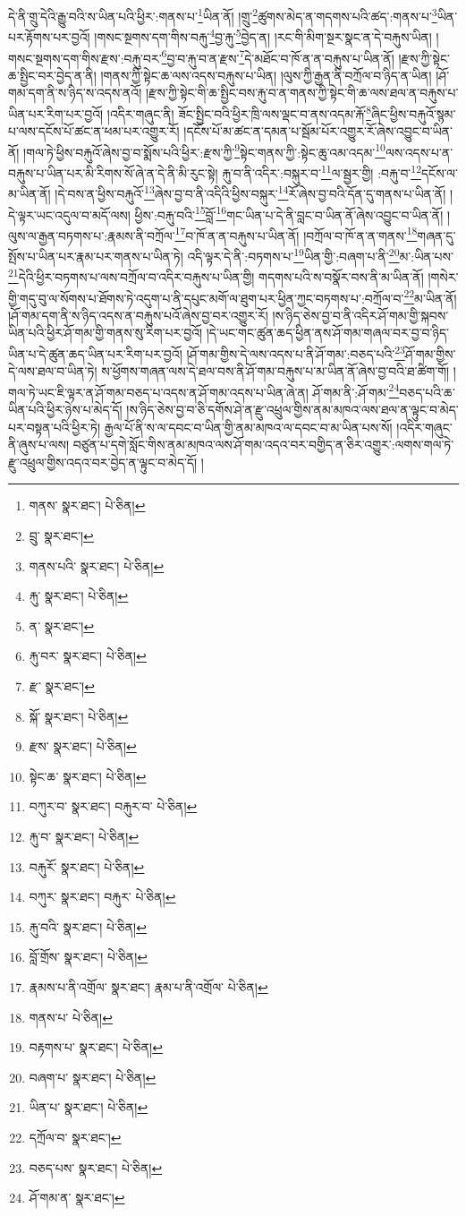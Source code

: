 དེ་ནི་གྲུ་དེའི་རྒྱུ་བའི་ས་ཡིན་པའི་ཕྱིར་:གནས་པ་\footnote{གནས་  སྣར་ཐང་།  པེ་ཅིན། }ཡིན་ནོ། །གྲུ་\footnote{བྲུ་  སྣར་ཐང་། }ཚུགས་མེད་ན་གདགས་པའི་ཚད་:གནས་པ་\footnote{གནས་པའི་  སྣར་ཐང་།  པེ་ཅིན། }ཡིན་པར་རྟོགས་པར་བྱའོ། །གསང་སྔགས་དག་གིས་བརྐུ་\footnote{རྐུ་  སྣར་ཐང་།  པེ་ཅིན། }བྱ་རྐུ་\footnote{ན་  སྣར་ཐང་། }བྱེད་ན། །རང་གི་མིག་སྔར་སྣང་ན་དེ་བརྐུས་ཡིན། །གསང་སྔགས་དག་གིས་རྫས་:བརྐུ་བར་\footnote{རྐུ་བར་  སྣར་ཐང་།  པེ་ཅིན། }བྱ་བ་རྐུ་བ་ན་རྫས་\footnote{རྫ་  སྣར་ཐང་། }དེ་མཐོང་བ་ཁོ་ན་ན་བརྐུས་པ་ཡིན་ནོ། །རྫས་ཀྱི་སྟེང་ཆ་སྤྱིང་བར་བྱེད་ན་ནི། །གནས་ཀྱི་སྟེང་ཆ་ལས་འདས་བརྐུས་པ་ཡིན། །ལུས་ཀྱི་རྒྱན་ནི་བཀྲོལ་བ་ཉིད་ན་ཡིན། །ཤོ་གམ་དག་ནི་ས་ཉིད་ས་འདས་ནའོ། །རྫས་ཀྱི་སྟེང་གི་ཆ་སྤྱིང་བས་རྐུ་བ་ན་གནས་ཀྱི་སྟེང་གི་ཆ་ལས་ཐལ་ན་བརྐུས་པ་ཡིན་པར་རིག་པར་བྱའོ། །འདིར་གཞུང་ནི། ཟོང་སྤྱིང་བའི་ཕྱིར་ཁྲི་ལས་ལྡང་བ་ནས་འདམ་རྐོ་\footnote{སྐོ་  སྣར་ཐང་།  པེ་ཅིན། }ཞིང་ཕྱིས་བརྐུའོ་སྙམ་པ་ལས་དངོས་པོ་ཚང་ན་ཕམ་པར་འགྱུར་རོ། །དངོས་པོ་མ་ཚང་ན་དམན་པ་སྦོམ་པོར་འགྱུར་རོ་ཞེས་འབྱུང་བ་ཡིན་ནོ། །གལ་ཏེ་ཕྱིས་བརྐུའོ་ཞེས་བྱ་བ་སྨོས་པའི་ཕྱིར་:རྫས་ཀྱི་\footnote{རྫས་  སྣར་ཐང་།  པེ་ཅིན། }སྟེང་གནས་ཀྱི་:སྟེང་ཆུ་འམ་འདམ་\footnote{སྟེང་ཆ་  སྣར་ཐང་།  པེ་ཅིན། }ལས་འདས་པ་ན་བརྐུས་པ་ཡིན་པར་མི་རིགས་སོ་ཞེ་ན་དེ་ནི་མི་རུང་སྟེ། རྐུ་བ་ནི་འདིར་:བསྐུར་བ་\footnote{བཀུར་བ་  སྣར་ཐང་། བརྐུར་བ་  པེ་ཅིན། }ལ་སྦྱར་གྱི། :བརྐུ་བ་\footnote{རྐུ་བ་  སྣར་ཐང་།  པེ་ཅིན། }དངོས་ལ་མ་ཡིན་ནོ། །དེ་བས་ན་ཕྱིས་བརྐུའོ་\footnote{བརྐུརོ་  སྣར་ཐང་།  པེ་ཅིན། }ཞེས་བྱ་བ་ནི་འདིའི་ཕྱིས་བསྐུར་\footnote{བཀུར་  སྣར་ཐང་། བརྐུར་  པེ་ཅིན། }རོ་ཞེས་བྱ་བའི་དོན་དུ་གནས་པ་ཡིན་ནོ། །དེ་ལྟར་ཡང་འདུལ་བ་མདོ་ལས། ཕྱིས་:བརྐུ་བའི་\footnote{རྐུ་བའི་  སྣར་ཐང་།  པེ་ཅིན། }བློ་\footnote{བློ་གྲོས་  སྣར་ཐང་།  པེ་ཅིན། }གང་ཡིན་པ་དེ་ནི་བླང་བ་ཡིན་ནོ་ཞེས་འབྱུང་བ་ཡིན་ནོ། །ལུས་ལ་རྒྱན་བཏགས་པ་:རྣམས་ནི་བཀྲོལ་\footnote{རྣམས་པ་ནི་འགྲོལ་  སྣར་ཐང་། རྣམ་པ་ནི་འགྲོལ་  པེ་ཅིན། }བ་ཁོ་ན་ན་བརྐུས་པ་ཡིན་ནོ། །བཀྲོལ་བ་ཁོ་ན་ན་གནས་\footnote{གནས་པ་  པེ་ཅིན། }གཞན་དུ་སྤོས་པ་ཡིན་པར་རྣམ་པར་གནས་པ་ཡིན་ཏེ། འདི་ལྟར་དེ་ནི་:བཏགས་པ་\footnote{བརྟགས་པ་  སྣར་ཐང་།  པེ་ཅིན། }ཡིན་གྱི་:བཞག་པ་ནི་\footnote{བཞག་པ་  སྣར་ཐང་།  པེ་ཅིན། }མ་:ཡིན་པས་\footnote{ཡིན་པ་  སྣར་ཐང་།  པེ་ཅིན། }དེའི་ཕྱིར་བཏགས་པ་ལས་བཀྲོལ་བ་འདིར་བརྐུས་པ་ཡིན་གྱི། གདགས་པའི་ས་བསྣོར་བས་ནི་མ་ཡིན་ནོ། །གསེར་གྱི་གདུ་བུ་ལ་སོགས་པ་ཐོགས་ཏེ་འདུག་པ་ནི་དཔུང་མགོ་ལ་ཐུག་པར་ཕྱིན་ཀྱང་བཏགས་པ་:བཀྲོལ་བ་\footnote{དཀྲོལ་བ་  སྣར་ཐང་། }མ་ཡིན་ནོ། །ཤོ་གམ་དག་ནི་ས་ཉིད་འདས་ན་བརྐུས་པའོ་ཞེས་བྱ་བར་འགྱུར་རོ། །ས་ཉིད་ཅེས་བྱ་བ་ནི་འདིར་ཤོ་གམ་གྱི་སྐབས་ཡིན་པའི་ཕྱིར་ཤོ་གམ་གྱི་གནས་སུ་རིག་པར་བྱའོ། །དེ་ཡང་གང་ཚུན་ཆད་ཕྱིན་ནས་ཤོ་གམ་གཞལ་བར་བྱ་བ་ཉིད་ཡིན་པ་དེ་ཚུན་ཆད་ཡིན་པར་རིག་པར་བྱའོ། །ཤོ་གམ་གྱིས་དེ་ལས་འདས་པ་ནི་ཤོ་གམ་:བཅད་པའི་\footnote{བཅད་པས་  སྣར་ཐང་།  པེ་ཅིན། }ཤོ་གམ་གྱིས་དེ་ལས་ཐལ་བ་ཡིན་ཏེ། ས་ཕྱོགས་གཞན་ལས་དེ་ཐལ་བས་ནི་ཤོ་གམ་བརྐུས་པ་མ་ཡིན་ནོ་ཞེས་བྱ་བའི་ཐ་ཚིག་གོ། །གལ་ཏེ་ཡང་ཇི་ལྟར་ན་ཤོ་གམ་བཅད་པ་འདས་ན་ཤོ་གམ་འདས་པ་ཡིན་ཞེ་ན། ཤོ་གམ་ནི་:ཤོ་གམ་\footnote{ཤོ་གམ་ན་  སྣར་ཐང་། }བཅད་པའི་ཆ་ཡིན་པའི་ཕྱིར་ཉེས་པ་མེད་དོ། །ས་ཉིད་ཅེས་བྱ་བ་ཅི་དགོས་ཤེ་ན་རྫུ་འཕྲུལ་གྱིས་ནམ་མཁའ་ལས་ཐལ་ན་ལྟུང་བ་མེད་པར་བསྟན་པའི་ཕྱིར་ཏེ། རྒྱལ་པོ་ནི་ས་ལ་དབང་བ་ཡིན་གྱི་ནམ་མཁའ་ལ་དབང་བ་མ་ཡིན་པས་སོ། །འདིར་གཞུང་ནི་ཞུས་པ་ལས། བཙུན་པ་དགེ་སློང་གིས་ནམ་མཁའ་ལས་ཤོ་གམ་འདའ་བར་བགྱིད་ན་ཅིར་འགྱུར་:ལགས་གལ་ཏེ་རྫུ་འཕྲུལ་གྱིས་འདའ་བར་བྱེད་ན་ལྟུང་བ་མེད་དོ། །
